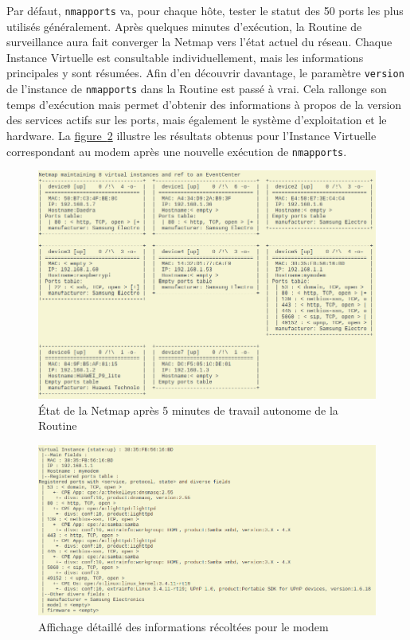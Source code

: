 \documentclass[]{article}
\newcommand{\wordlink}[2]{\hyperref[#1]{#2~\ref{#1}}}
\begin{document}
\vspace{0.3cm}

Par défaut, \texttt{nmapports} va, pour chaque hôte, tester le statut des 50 ports les plus utilisés généralement. Après quelques minutes d'exécution, la Routine de surveillance aura fait converger la Netmap vers l'état actuel du réseau. Chaque Instance Virtuelle est consultable individuellement, mais les informations principales y sont résumées. Afin d'en découvrir davantage, le paramètre \texttt{version} de l'instance de \texttt{nmapports} dans la Routine est passé à vrai. Cela rallonge son temps d'exécution mais permet d'obtenir des informations à propos de la version des services actifs sur les ports, mais également le système d'exploitation et le hardware. La \wordlink{modemdisc}{figure} illustre les résultats obtenus pour l'Instance Virtuelle correspondant au modem après une nouvelle exécution de \texttt{nmapports}.

\vspace{0.3cm}

\begin{figure}[!ht]
\centering
     \includegraphics[width=0.7\linewidth]{netmapDisc}
     \caption{État de la Netmap après 5 minutes de travail autonome de la Routine}
     \label{netmapdisc}
\end{figure}

\newpage


\begin{figure}[!ht]
\centering
     \includegraphics[width=0.8\linewidth]{modemDisc}
     \caption{Affichage détaillé des informations récoltées pour le modem}
     \label{modemdisc}
\end{figure}
\end{document}
